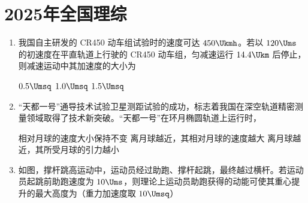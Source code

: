 \documentclass[\gkver]{gaokaozhenti}
\begin{document}
\chapter{2025年全国理综}

\begin{enumerate}
\item
我国自主研发的 CR450 动车组试验时的速度可达 $450 \Ukmh$。若以 $120 \Ums$ 的初速度在平直轨道上行驶的 CR450 动车组，匀减速运行 $14.4 \Ukm$ 后停止，则减速运动中其加速度的大小为

\fourchoices[answer=B]
{$0.1 \Umsq$}
{$0.5 \Umsq$}
{$1.0 \Umsq$}
{$1.5 \Umsq$}


\item
“天都一号”通导技术试验卫星测距试验的成功，标志着我国在深空轨道精密测量领域取得了技术新突破。“天都一号”在环月椭圆轨道上运行时，

{相对月球的速度大小保持不变}
{离月球越近，其相对月球的速度越大}
{离月球越近，其所受月球的引力越小}


\item
如图，撑杆跳高运动中，运动员经过助跑、撑杆起跳，最终越过横杆。若运动员起跳前助跑速度为 $10 \Ums$，则理论上运动员助跑获得的动能可使其重心提升的最大高度为（重力加速度取 $10 \Umsq$）


\end{enumerate}
\end{document}
